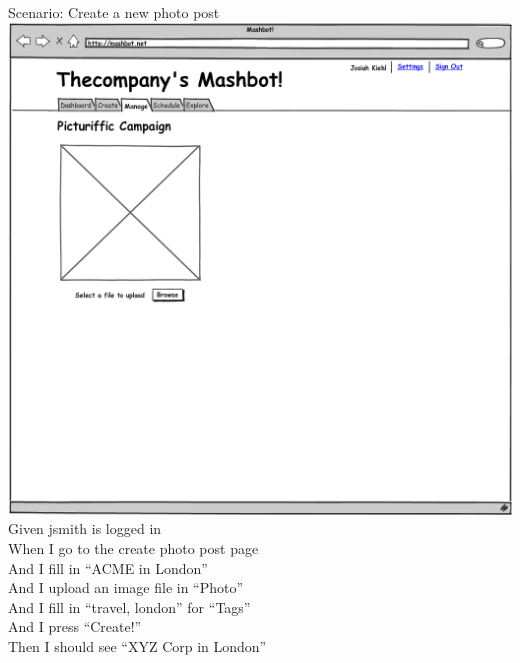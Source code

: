 \documentclass[12pt]{article}
\begin{document}
\begin{hangparas}{0.25in}{1}
Scenario: Create a new photo post \\
\includegraphics[width=\textwidth]{../mockups/manage-create-image.png}
  Given jsmith is logged in \\
  When I go to the create photo post page \\
  And I fill in ``ACME in London'' \\
  And I upload an image file in ``Photo'' \\
  And I fill in ``travel, london'' for ``Tags'' \\
  And I press ``Create!'' \\
  Then I should see ``XYZ Corp in London'' \\
  

\end{hangparas}
\end{document}
